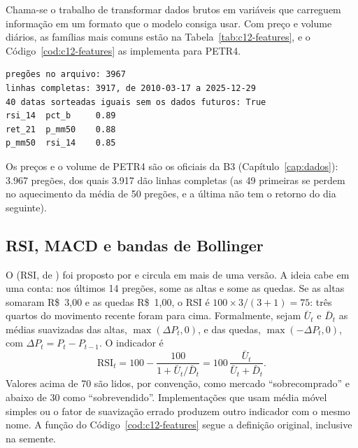 Chama-se  o trabalho de transformar dados brutos em variáveis que carreguem informação em um formato que o modelo consiga usar. Com preço e volume diários, as famílias mais comuns estão na Tabela~\ref{tab:c12-features}, e o Código~\ref{cod:c12-features} as implementa para PETR4.


\begin{lstlisting}[style=saida]
pregões no arquivo: 3967
linhas completas: 3917, de 2010-03-17 a 2025-12-29
40 datas sorteadas iguais sem os dados futuros: True
rsi_14  pct_b     0.89
ret_21  p_mm50    0.88
p_mm50  rsi_14    0.85
\end{lstlisting}

Os preços e o volume de PETR4 são os oficiais da B3 (Capítulo~\ref{cap:dados}): 3.967 pregões, dos quais 3.917 dão linhas completas (as 49 primeiras se perdem no aquecimento da média de 50 pregões, e a última não tem o retorno do dia seguinte).

\subsection{RSI, MACD e bandas de Bollinger}

O  (RSI, de ) foi proposto por \citet{wilder1978} e circula em mais de uma versão. A ideia cabe em uma conta: nos últimos 14 pregões, some as altas e some as quedas. Se as altas somaram R\$~3,00 e as quedas R\$~1,00, o RSI é $100 \times 3/(3+1) = 75$: três quartos do movimento recente foram para cima. Formalmente, sejam $\bar U_t$ e $\bar D_t$ as médias suavizadas das altas, $\max(\Delta P_t, 0)$, e das quedas, $\max(-\Delta P_t, 0)$, com $\Delta P_t = P_t - P_{t-1}$. O indicador é
\begin{equation}
  \text{RSI}_t = 100 - \frac{100}{1 + \bar U_t / \bar D_t} = 100\,\frac{\bar U_t}{\bar U_t + \bar D_t} .
  \label{eq:c12-rsi}
\end{equation}
Valores acima de 70 são lidos, por convenção, como mercado ``sobrecomprado'' e abaixo de 30 como ``sobrevendido''. Implementações que usam média móvel simples ou o fator de suavização errado produzem outro indicador com o mesmo nome. A função  do Código~\ref{cod:c12-features} segue a definição original, inclusive na semente.

